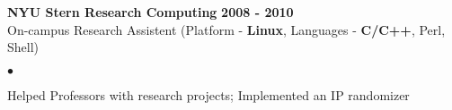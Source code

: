 \documentclass[margin,line]{res}
\newenvironment{list2}{
  \begin{list}{$\bullet$}{%
      \setlength{\itemsep}{0.05in}
      \setlength{\parsep}{0in} \setlength{\parskip}{0in}
      \setlength{\topsep}{-0.1in} \setlength{\partopsep}{0in}
      \setlength{\leftmargin}{0.2in}}}{\end{list}}
\begin{document}
\begin{resume}
\vspace {0.1in}
{\bf NYU Stern Research Computing} \hfill {\bf 2008 - 2010}\\
On-campus Research Assistent (Platform - {\bf Linux}, Languages - {\bf C/C++}, Perl, Shell)
\begin{list2}
\item Helped Professors with research projects; Implemented an IP randomizer
\end{list2}


\end{resume}
\end{document}
